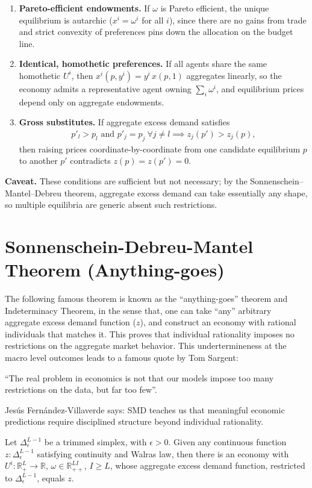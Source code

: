 \begin{enumerate}
    \item \textbf{Pareto-efficient endowments.} If $\omega$ is Pareto efficient, the unique equilibrium is autarchic ($x^i = \omega^i$ for all $i$), since there are no gains from trade and strict convexity of preferences pins down the allocation on the budget line.
    
    \item \textbf{Identical, homothetic preferences.} If all agents share the same homothetic $U^i$, then $x^i(p, y^i) = y^i \, x(p, 1)$ aggregates linearly, so the economy admits a representative agent owning $\sum_i \omega^i$, and equilibrium prices depend only on aggregate endowments.
    
    \item \textbf{Gross substitutes.} If aggregate excess demand satisfies
    \begin{align*}
        p'_l > p_l \text{ and } p'_j = p_j \ \forall j \neq l \implies z_j(p') > z_j(p),
    \end{align*}
    then raising prices coordinate-by-coordinate from one candidate equilibrium $p$ to another $p'$ contradicts $z(p) = z(p') = 0$.
\end{enumerate}

\textbf{Caveat.} These conditions are sufficient but not necessary; by the Sonnenschein--Mantel--Debreu theorem, aggregate excess demand can take essentially any shape, so multiple equilibria are generic absent such restrictions.


\section{Sonnenschein-Debreu-Mantel Theorem (Anything-goes)}
The following famous theorem is known as the ``anything-goes'' theorem and Indeterminacy Theorem, 
in the sense that,
one can take ``any'' arbitrary aggregate excess demand function ($z$), 
and construct an economy with rational individuals that matches it.
This proves that individual rationality imposes no restrictions on the aggregate market behavior.
This undertermineness at the macro level outcomes leads to a famous quote by Tom Sargent:
\begin{tcolorbox}
    \quad ``The real problem in economics is not that our models impose too many restrictions on the data, but far too few''.
\end{tcolorbox}
Jesús Fernández-Villaverde says: SMD teaches us that meaningful economic predictions require disciplined structure beyond individual rationality.



\begin{proposition}
    Let $\Delta_\epsilon^{L-1}$ be a trimmed simplex, with $\epsilon > 0$. 
    Given any continuous function $z : \Delta_\epsilon^{L-1}$
    satisfying continuity and Walras law,
    then there is an economy with $U^i: \mathbb{R}^L_{+} \rightarrow \mathbb{R}$, 
    $\omega \in  \mathbb{R}^{LI}_{++}$, $I \geq L$, 
    whose aggregate excess demand function, restricted to $\Delta_\epsilon^{L-1}$, equals $z$.
\end{proposition}

